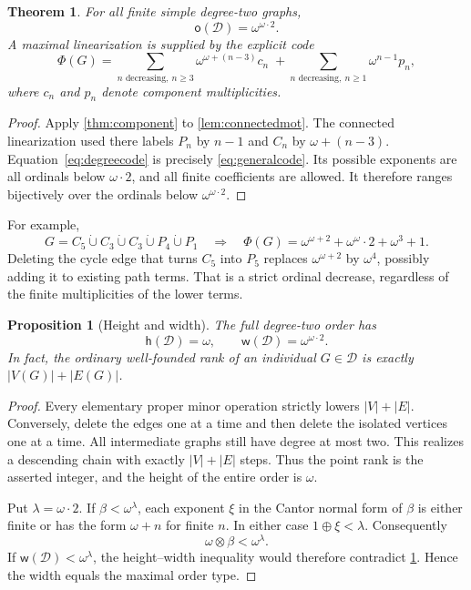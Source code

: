 \documentclass[11pt,letterpaper]{article}
\theoremstyle{plain}
\newtheorem{theorem}{Theorem}[section]
\newtheorem{proposition}[proposition]{Proposition}
\theoremstyle{definition}
\theoremstyle{remark}
\newcommand{\mot}{\mathsf o}
\newcommand{\wid}{\mathsf w}
\newcommand{\hei}{\mathsf h}
\newcommand{\DG}{\mathcal D}
\newcommand{\sqgraph}{\mathbin{\dot\cup}}
\begin{document}
\begin{theorem}\label{thm:fullmot}
For all finite simple degree-two graphs,
\[
 \mot(\DG)=\omega^{\omega\cdot2}.
\]
A maximal linearization is supplied by the explicit code
\begin{equation}\label{eq:degreecode}
 \Phi(G)=
 \sum_{n\text{ decreasing},\ n\ge3}\omega^{\omega+(n-3)}c_n
 \; +\!
 \sum_{n\text{ decreasing},\ n\ge1}\omega^{n-1}p_n,
\end{equation}
where $c_n$ and $p_n$ denote component multiplicities.
\end{theorem}

\begin{proof}
Apply \cref{thm:component} to \cref{lem:connectedmot}.
The connected linearization used there labels $P_n$ by $n-1$ and
$C_n$ by $\omega+(n-3)$. Equation~\eqref{eq:degreecode} is precisely
\cref{eq:generalcode}. Its possible exponents are all ordinals below
$\omega\cdot2$, and all finite coefficients are allowed. It therefore
ranges bijectively over the ordinals below $\omega^{\omega\cdot2}$.
\end{proof}

For example,
\[
 G=C_5\sqgraph C_3\sqgraph C_3\sqgraph P_4\sqgraph P_1
 \quad\Longrightarrow\quad
 \Phi(G)=\omega^{\omega+2}+\omega^\omega\cdot2+\omega^3+1.
\]
Deleting the cycle edge that turns $C_5$ into $P_5$ replaces
$\omega^{\omega+2}$ by $\omega^4$, possibly adding it to existing
path terms. That is a strict ordinal decrease, regardless of the
finite multiplicities of the lower terms.

\begin{proposition}[Height and width]\label{prop:fullinvariants}
The full degree-two order has
\[
 \hei(\DG)=\omega,\qquad \wid(\DG)=\omega^{\omega\cdot2}.
\]
In fact, the ordinary well-founded rank of an individual $G\in\DG$ is
exactly $|V(G)|+|E(G)|$.
\end{proposition}

\begin{proof}
Every elementary proper minor operation strictly lowers $|V|+|E|$.
Conversely, delete the edges one at a time and then delete the isolated
vertices one at a time. All intermediate graphs still have degree at
most two. This realizes a descending chain with exactly $|V|+|E|$
steps. Thus the point rank is the asserted integer, and the height of
the entire order is $\omega$.

Put $\lambda=\omega\cdot2$. If $\beta<\omega^\lambda$, each exponent
$\xi$ in the Cantor normal form of $\beta$ is either finite or has
the form $\omega+n$ for finite $n$. In either case
$1\oplus\xi<\lambda$. Consequently
\[
 \omega\otimes\beta<\omega^\lambda.
\]
If $\wid(\DG)<\omega^\lambda$, the height--width inequality would
therefore contradict \cref{thm:fullmot}. Hence the width equals the
maximal order type.
\end{proof}
\end{document}
